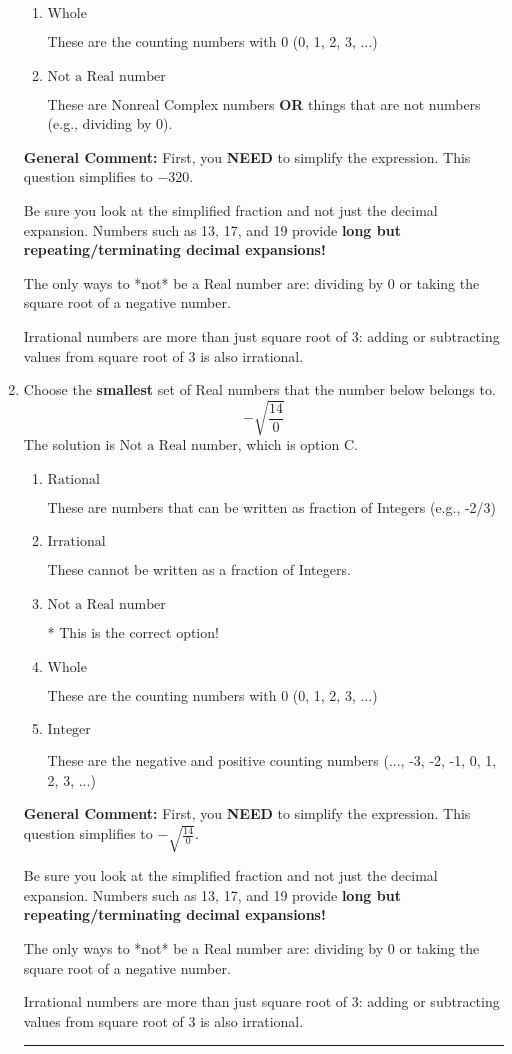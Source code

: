\documentclass{extbook}[14pt]
\newcommand{\litem}[1]{\item #1

\rule{\textwidth}{0.4pt}}
\begin{document}
\begin{enumerate}
{\begin{enumerate}[label=\Alph*.]
These cannot be written as a fraction of Integers.
\item \( \text{Whole} \)

These are the counting numbers with 0 (0, 1, 2, 3, ...)
\item \( \text{Not a Real number} \)

These are Nonreal Complex numbers \textbf{OR} things that are not numbers (e.g., dividing by 0).
\end{enumerate}

\textbf{General Comment:} First, you \textbf{NEED} to simplify the expression. This question simplifies to $-320$. 
 
 Be sure you look at the simplified fraction and not just the decimal expansion. Numbers such as 13, 17, and 19 provide \textbf{long but repeating/terminating decimal expansions!} 
 
 The only ways to *not* be a Real number are: dividing by 0 or taking the square root of a negative number. 
 
 Irrational numbers are more than just square root of 3: adding or subtracting values from square root of 3 is also irrational.
}
\litem{
Choose the \textbf{smallest} set of Real numbers that the number below belongs to.
\[ -\sqrt{\frac{14}{0}} \]The solution is \( \text{Not a Real number} \), which is option C.\begin{enumerate}[label=\Alph*.]
\item \( \text{Rational} \)

These are numbers that can be written as fraction of Integers (e.g., -2/3)
\item \( \text{Irrational} \)

These cannot be written as a fraction of Integers.
\item \( \text{Not a Real number} \)

* This is the correct option!
\item \( \text{Whole} \)

These are the counting numbers with 0 (0, 1, 2, 3, ...)
\item \( \text{Integer} \)

These are the negative and positive counting numbers (..., -3, -2, -1, 0, 1, 2, 3, ...)
\end{enumerate}

\textbf{General Comment:} First, you \textbf{NEED} to simplify the expression. This question simplifies to $-\sqrt{\frac{14}{0}}$. 
 
 Be sure you look at the simplified fraction and not just the decimal expansion. Numbers such as 13, 17, and 19 provide \textbf{long but repeating/terminating decimal expansions!} 
 
 The only ways to *not* be a Real number are: dividing by 0 or taking the square root of a negative number. 
 
 Irrational numbers are more than just square root of 3: adding or subtracting values from square root of 3 is also irrational.
}
\end{enumerate}
\end{document}
